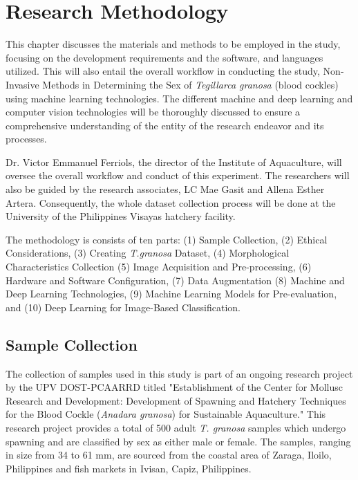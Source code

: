 \chapter{Research Methodology}
\label{sec:methodology}

This chapter discusses the materials and methods to be employed in the study, focusing on the development requirements and the software, and languages utilized. This will also entail the overall workflow in conducting the study, Non-Invasive Methods in Determining the Sex of \textit{Tegillarca granosa} (blood cockles) using machine learning technologies. The different machine and deep learning and computer vision technologies will be thoroughly discussed to ensure a comprehensive understanding of the entity of the research endeavor and its processes. 

Dr. Victor Emmanuel Ferriols, the director of the Institute of Aquaculture, will oversee the overall workflow and conduct of this experiment. The researchers will also be guided by the research associates, LC Mae Gasit and Allena Esther Artera. Consequently, the whole dataset collection process will be done at the University of the Philippines Visayas hatchery facility. 

The methodology is consists of ten parts: (1) Sample Collection, (2) Ethical Considerations, (3) Creating \textit{T.granosa} Dataset, (4) Morphological Characteristics Collection (5) Image Acquisition and Pre-processing, (6) Hardware and Software Configuration, (7) Data Augmentation (8) Machine and Deep Learning Technologies, (9) Machine Learning Models for Pre-evaluation, and (10) Deep Learning for Image-Based Classification. 

\section{Sample Collection}
\label{sec:samplecollect}
The collection of \Tgranosa samples used in this study is part of an ongoing research project by the UPV DOST-PCAARRD titled "Establishment of the Center for Mollusc Research and Development: Development of Spawning and Hatchery Techniques for the Blood Cockle (\textit{Anadara granosa}) for Sustainable Aquaculture." This research project provides a total of 500 adult \textit{T. granosa} samples which undergo spawning and are classified by sex as either male or female. The samples, ranging in size from 34 to 61 mm, are sourced from the coastal area of Zaraga, Iloilo, Philippines and fish markets in Ivisan, Capiz, Philippines. 

